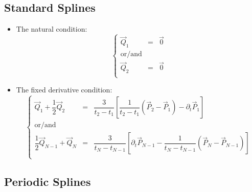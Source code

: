 \documentclass[aps,11pt]{revtex4}
\begin{document}
\subsection{Standard Splines}
\begin{itemize}
\item The natural condition: 
\begin{equation}
\left\lbrace
\begin{array}{rcl}
\vec{Q}_1 & = &\vec{0} \\
\text{or/and}\\
\vec{Q}_2 & = & \vec{0}\\
\end{array}
\right.
\end{equation}

\item The fixed derivative condition:
\begin{equation}
\left\lbrace
\begin{array}{rcl}
	\vec{Q}_1 + \dfrac{1}{2}\vec{Q}_2 & = &\dfrac{3}{t_2-t_1} \left[ \dfrac{1}{t_2-t_1} \left(\vec{P}_2-\vec{P}_1\right) - \partial_t \vec{P}_1 \right]\\
	\text{or/and}\\
	\dfrac{1}{2}\vec{Q}_{N-1} +\vec{Q}_N& =& \dfrac{3}{t_N-t_{N-1}} \left[\partial_t \vec{P}_{N-1} - \dfrac{1}{t_N-t_{N-1}}\left(\vec{P}_N - \vec{P}_{N-1}\right)\right]\\
\end{array}
\right.
\end{equation}
\end{itemize}

\subsection{Periodic Splines}
\end{document}
